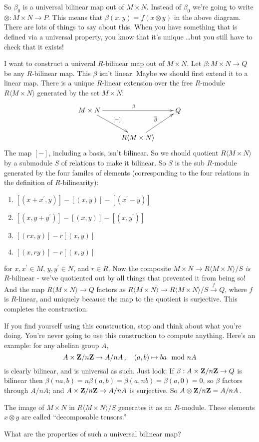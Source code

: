 So $\beta_0$ is a universal bilinear map out of $M\times N$. Instead of $\beta_0$ we're going to write $\otimes:M\times N\rightarrow P$. This means that $\beta(x,y)=f(x\otimes y)$ in the above diagram. There are lots of things to say about this. When you have something that is defined via a universal property, you know that it's unique \ldots but you still have to check that it exists!
\begin{construction}
I want to construct a univeral $R$-bilinear map out of $M\times N$. Let $\beta:M\times N\to Q$ be any $R$-bilinear map. This $\beta$ isn't linear. Maybe we should first extend it to a linear map. There is a unique $R$-linear extension
over the free $R$-module $R\langle M\times N\rangle$ generated by the set 
$M\times N$:
\begin{equation*}
\xymatrix{M\times N\ar[rr]^\beta\ar[dr]^{[-]} & & Q\\
& R\langle M\times N\rangle\ar[ur]^{\overline{\beta}} &}
\end{equation*}
The map $[-]$, including a basis, isn't bilinear. So we should quotient $R\langle M\times N\rangle$ by a submodule $S$ of relations to make it bilinear. So $S$ is the sub $R$-module generated by the four familes of elements (corresponding to the four relations in the definition of $R$-bilinearity): 
\begin{enumerate}
\item $[(x+x^\prime,y)]-[(x,y)]-[(x^\prime-y)]$
\item $[(x,y+y^\prime)]-[(x,y)]-[(x,y^\prime)]$
\item $[(rx,y)]-r[(x,y)]$
\item $[(x,ry)]-r[(x,y)]$
\end{enumerate}
for $x,x^\prime\in M$, $y,y^\prime\in N$, and $r\in R$. Now the composite
$M\times N\to R\langle M\times N\rangle/S$ {\em is} $R$-bilinear - we've quotiented out by all things that prevented it from being so! And the map $R\langle M\times N\rangle\to Q$ factors as $R\langle M\times N\rangle\to R\langle M\times N\rangle/S\xrightarrow{f} Q$, where $f$ is $R$-linear, and uniquely because the map to the quotient is surjective. This completes the construction.
\end{construction}

If you find yourself using this construction, stop and think about what you're doing. You're never going to use this construction to compute anything. 
Here's an example: for any abelian group $A$, 
\[
A\times \mathbf Z/n\mathbf Z\to A/nA\,,\quad (a,b)\mapsto ba\mod nA
\]
is clearly bilinear, and is universal as such. Just look: If 
$\beta:A\times\mathbf Z/n\mathbf Z\to Q$ is bilinear then 
$\beta(na,b)=n\beta(a,b)=\beta(a,nb)=\beta(a,0)=0$, so $\beta$ factors through 
$A/nA$; and $A\times\mathbf Z/n\mathbf Z\to A/nA$ is surjective. So $A\otimes\mathbf Z/n\mathbf Z=A/nA$.
\begin{remark}
The image of $M\times N$ in $R\langle M\times N\rangle/S$ generates it as an $R$-module. These elements $x\otimes y$ are called ``decomposable tensors.'' 
\end{remark}
What are the properties of such a universal bilinear map? 

